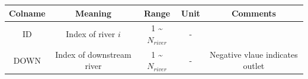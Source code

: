 \documentclass[]{scrbook}
\begin{document}
\begin{longtable}[]{@{}ccccc@{}}
\toprule
\begin{minipage}[b]{0.11\columnwidth}\centering\strut
Colname\strut
\end{minipage} & \begin{minipage}[b]{0.25\columnwidth}\centering\strut
Meaning\strut
\end{minipage} & \begin{minipage}[b]{0.11\columnwidth}\centering\strut
Range\strut
\end{minipage} & \begin{minipage}[b]{0.11\columnwidth}\centering\strut
Unit\strut
\end{minipage} & \begin{minipage}[b]{0.29\columnwidth}\centering\strut
Comments\strut
\end{minipage}\tabularnewline
\midrule
\endhead
\begin{minipage}[t]{0.11\columnwidth}\centering\strut
ID\strut
\end{minipage} & \begin{minipage}[t]{0.25\columnwidth}\centering\strut
Index of river \(i\)\strut
\end{minipage} & \begin{minipage}[t]{0.11\columnwidth}\centering\strut
1 \textasciitilde{} \(N_{river}\)\strut
\end{minipage} & \begin{minipage}[t]{0.11\columnwidth}\centering\strut
-\strut
\end{minipage} & \begin{minipage}[t]{0.29\columnwidth}\centering\strut
\strut
\end{minipage}\tabularnewline
\begin{minipage}[t]{0.11\columnwidth}\centering\strut
DOWN\strut
\end{minipage} & \begin{minipage}[t]{0.25\columnwidth}\centering\strut
Index of downstream river\strut
\end{minipage} & \begin{minipage}[t]{0.11\columnwidth}\centering\strut
1 \textasciitilde{} \(N_{river}\)\strut
\end{minipage} & \begin{minipage}[t]{0.11\columnwidth}\centering\strut
-\strut
\end{minipage} & \begin{minipage}[t]{0.29\columnwidth}\centering\strut
Negative vlaue indicates outlet\strut

\end{minipage}
\end{longtable}
\end{document}
